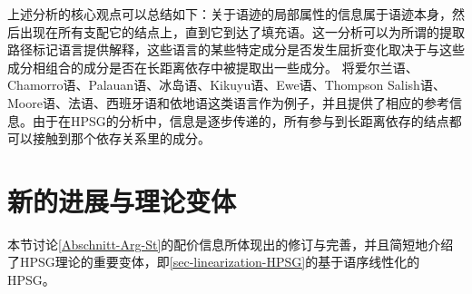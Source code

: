 上述分析的核心观点可以总结如下：关于语迹的局部属性的信息属于语迹本身，然后出现在所有支配它的结点上，直到它到达了填充语。这一分析可以为所谓的提取路径标记语言提供解释，这些语言的某些特定成分是否发生屈折变化取决于与这些成分相组合的成分是否在长距离依存中被提取出一些成分。 \citet*{BMS2001a}将\label{page-Irish-complementizers}爱尔兰语、Chamorro语、Palauan语、冰岛语、Kikuyu语、Ewe语、Thompson Salish语、Moore语、法语、西班牙语和依地语这类语言作为例子，并且提供了相应的参考信息。由于在HPSG的分析中，信息是逐步传递的，所有参与到长距离依存的结点都可以接触到那个依存关系里的成分。

\section{新的进展与理论变体}

本节讨论\ref{Abschnitt-Arg-St}的配价信息所体现出的修订与完善，并且简短地介绍了HPSG理论的重要变体，即\ref{sec-linearization-HPSG}的基于语序线性化的HPSG。

